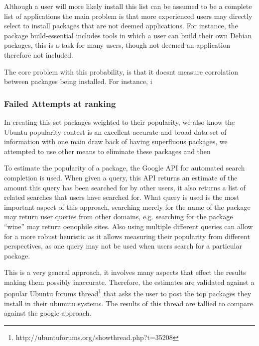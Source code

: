 Although a user will more likely install this list can be assumed to be a complete list of applications 
the main problem is that more experienced users may directly select to install packages that are not deemed applications.
For instance, the package build-essential includes tools in which a user can build their own Debian packages,
this is a task for many users, though not deemed an application therefore not included.

The core problem with this probability, is that it doesnt measure corrolation between packages being installed.
For instance, i


\subsubsection{Failed Attempts at ranking}
In creating this set packages weighted to their popularity, we also  know the Ubuntu popularity contest is an excellent accurate and broad data-set of information with one main draw back of having superfluous packages,
we attempted to use other means to eliminate these packages and then  

To estimate the popularity of a package, the Google API for automated search completion is used.
When given a query, this API returns an estimate of the amount this query has been searched for by other users,
it also returns a list of related searches that users have searched for.
What query is used is the most important aspect of this approach,
searching merely for the name of the package may return user queries from other domains, e.g. searching for the package ``wine'' may return oenophile sites.
Also using multiple different queries can allow for a more robust heuristic as it allows measuring their popularity from different perspectives,
as one query may not be used when users search for a particular package.

This is a very general approach, it involves many aspects that effect the results making them possibly inaccurate.
Therefore, the estimates are validated against a popular Ubuntu forums thread\footnote{http://ubuntuforums.org/showthread.php?t=35208} 
that asks the user to post the top packages they install in their ubunutu systems. 
The results of this thread are tallied to compare against the google approach.

